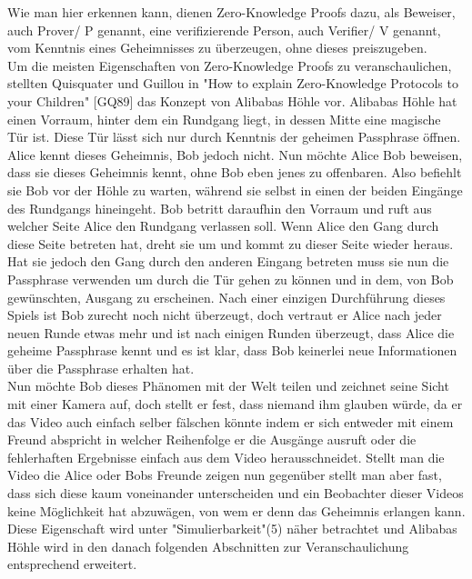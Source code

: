 \documentclass {article}
\begin{document}
Wie man hier erkennen kann, dienen Zero-Knowledge Proofs dazu, als Beweiser, auch Prover/ P genannt, eine
verifizierende Person, auch Verifier/ V genannt, vom Kenntnis eines Geheimnisses zu überzeugen, ohne dieses preiszugeben. \\ 

Um die meisten Eigenschaften von Zero-Knowledge Proofs zu veranschaulichen, stellten Quisquater und Guillou in "How to explain Zero-Knowledge Protocols to your Children" [GQ89] das Konzept von Alibabas H\"ohle vor. Alibabas H\"ohle hat einen Vorraum, hinter dem ein Rundgang liegt, in dessen Mitte eine magische T\"ur ist. Diese T\"ur l\"asst sich nur durch Kenntnis der geheimen Passphrase \"offnen. Alice kennt dieses Geheimnis, Bob jedoch nicht. Nun m\"ochte Alice Bob beweisen, dass sie dieses Geheimnis kennt, ohne Bob eben jenes zu offenbaren. Also befiehlt sie Bob vor der H\"ohle zu warten, w\"ahrend sie selbst in einen der beiden Eing\"ange des Rundgangs hineingeht. Bob betritt daraufhin den Vorraum und ruft aus welcher Seite Alice den Rundgang verlassen soll. Wenn Alice den Gang durch diese Seite betreten hat, dreht sie um und kommt zu dieser Seite wieder heraus. Hat sie jedoch den Gang durch den anderen Eingang betreten muss sie nun die Passphrase verwenden um durch die T\"ur gehen zu k\"onnen und in dem, von Bob gewünschten, Ausgang zu erscheinen. Nach einer einzigen Durchf\"uhrung dieses Spiels ist Bob zurecht noch nicht \"uberzeugt, doch vertraut er Alice nach jeder neuen Runde etwas mehr und ist nach einigen Runden \"uberzeugt, dass Alice die geheime Passphrase kennt und es ist klar, dass Bob keinerlei neue Informationen \"uber die Passphrase erhalten hat. \\  Nun m\"ochte Bob dieses Ph\"anomen mit der Welt teilen und zeichnet seine Sicht mit einer Kamera auf, doch stellt er fest, dass niemand ihm glauben würde, da er das Video auch einfach selber f\"alschen k\"onnte indem er sich entweder mit einem Freund abspricht in welcher Reihenfolge er die Ausg\"ange ausruft oder die fehlerhaften Ergebnisse einfach aus dem Video herausschneidet. 
Stellt man die Video die Alice oder Bobs Freunde zeigen nun gegen\"uber stellt man aber fast, dass sich diese kaum voneinander unterscheiden und ein Beobachter dieser Videos keine M\"oglichkeit hat abzuw\"agen, von wem er denn das Geheimnis erlangen kann.
Diese Eigenschaft wird unter "Simulierbarkeit"(5) n\"aher betrachtet und Alibabas H\"ohle wird in den danach folgenden Abschnitten zur Veranschaulichung entsprechend erweitert.
\end{document}
